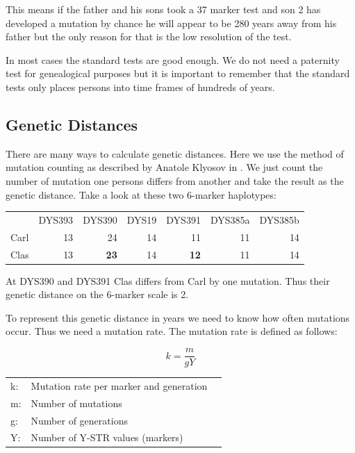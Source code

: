 This means if the father and his sons took a 37 marker test
and son 2 has developed a mutation by chance he will appear
to be 280 years away from his father but the only reason for
that is the low resolution of the test.

In most cases the standard tests are good enough. We do not
need a paternity test for genealogical purposes but it is
important to remember that the standard tests only places
persons into time frames of hundreds of years.


\subsection{Genetic Distances}

There are many ways to calculate genetic distances. Here we
use the method of mutation counting as described by Anatole
Klyosov in \cite{Kly09}.
We just count the number of mutation one persons differs from
another and take the result as the genetic distance.
Take a look at these two 6-marker haplotypes:

\vspace{1em}
\begin{tabular}{lrrrrrr}
       & DYS393 & DYS390      & DYS19 & DYS391      & DYS385a & DYS385b \\
Carl   &     13 & 24          & 14    & 11          & 11      & 14 \\
Clas   &     13 & \textbf{23} & 14    & \textbf{12} & 11      & 14
\end{tabular}
\vspace{1em}

At DYS390 and DYS391 Clas differs from Carl by one mutation.
Thus their genetic distance on the 6-marker scale is 2.

To represent this genetic distance in years we need to know
how often mutations occur. Thus we need a mutation rate.
The mutation rate is defined as follows:

\begin{equation}
k = \frac{m}{g Y} \label{mutationrate}
\end{equation}

\begin{tabular}{lll}
k: &  Mutation rate per marker and generation\\
m: &  Number of mutations \\
g: &  Number of generations \\
Y: &  Number of Y-STR values (markers)
\end{tabular}
\vspace{1em}

